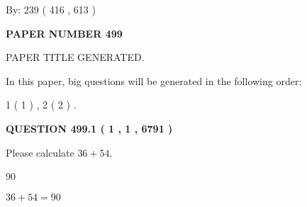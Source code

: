 \documentclass[12pt]{article}
\begin{document}
   
\hspace{1.0in} By: 
 239 ( 416 ,  613 )
   
   
   
   
\newpage 
\setcounter{page}{ 
   499001 } 
   
   
   
   
 {\textbf{ \Large{ PAPER NUMBER  499  }}}
   
   
\vspace{0.2in}
   
   
   
   
   
   
   
   
 \vspace{0.2in}
 
 
 
 
   
   
 PAPER TITLE GENERATED.
   
   
   
\vspace{0.2in}
   
In this paper, big questions will be generated in the following order: 
   
   
   1 ( 1 )
 ,
   2 ( 2 )
 .
  
\vspace{0.2in}
  
{\textbf{\Large{QUESTION
499.1 
 ( 1 , 1 , 6791 )
}}}
  
  
 
Please calculate $ %
36 +  %
54 $.
 
 
 
\noindent{}
 
 

90
 
 
\noindent{}
 
 

 
 
 
\noindent{}
 
 

$ %
36 +  %
54=   %
90$
 
 
\noindent{}
 
\end{document}
